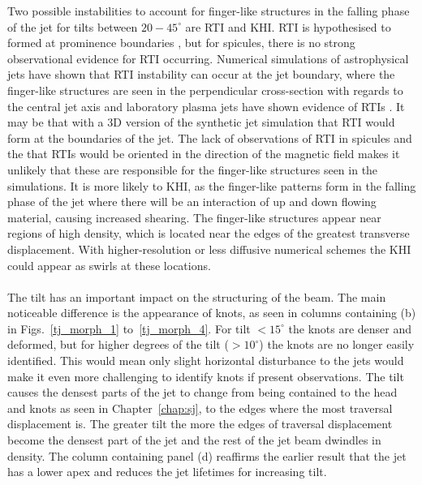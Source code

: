\documentclass[12pt]{ociamthesis}
\newcommand{\mfig}[4]{
  \begin{figure}
  \begin{center}
  \texttt{[image: \#2]}
  \caption{#3}
  \label{#4}
  \end{center}
  \end{figure}}
\newcommand{\np}{\\ \\}
\newcommand{\degs}{^{\circ}}
\begin{document}
Two possible instabilities to account for finger-like structures in the falling phase of the jet for tilts between $20-45\degs$ are RTI and KHI. RTI is hypothesised to formed at prominence boundaries \citep{Berger2008ApJ676L89B,Berger2010ApJ7161288B,Hillier2012ApJ746120H,Berger2017ApJ85060B}, but for spicules, there is no strong observational evidence for RTI occurring. Numerical simulations of astrophysical jets have shown that RTI instability can occur at the jet boundary, where the finger-like structures are seen in the perpendicular cross-section with regards to the central jet axis \citep{Toma2017MNRAS4721253T,Matsumoto2017MNRAS4721421M} and laboratory plasma jets have shown evidence of RTIs \citep{Zhai2016PhPl23c2121Z}. It may be that with a 3D version of the synthetic jet simulation that RTI would form at the boundaries of the jet. The lack of observations of RTI in spicules and the that RTIs would be oriented in the direction of the magnetic field makes it unlikely that these are responsible for the finger-like structures seen in the simulations. It is more likely to KHI, as the finger-like patterns form in the falling phase of the jet where there will be an interaction of up and down flowing material, causing increased shearing. The finger-like structures appear near regions of high density, which is located near the edges of the greatest transverse displacement. With higher-resolution or less diffusive numerical schemes the KHI could appear as swirls at these locations. \np
%
The tilt has an important impact on the structuring of the beam. The main noticeable difference is the appearance of knots, as seen in columns containing (b) in Figs.~\ref{tj_morph_1} to~\ref{tj_morph_4}. For tilt $<15\degs$ the knots are denser and deformed, but for higher degrees of the tilt ($> 10^{\circ}$) the knots are no longer easily identified. This would mean only slight horizontal disturbance to the jets would make it even more challenging to identify knots if present observations. The tilt causes the densest parts of the jet to change from being contained to the head and knots as seen in Chapter~\ref{chap:sj}, to the edges where the most traversal displacement is. The greater tilt the more the edges of traversal displacement become the densest part of the jet and the rest of the jet beam dwindles in density. The column containing panel (d) reaffirms the earlier result that the jet has a lower apex and reduces the jet lifetimes for increasing tilt.
%
\end{document}
